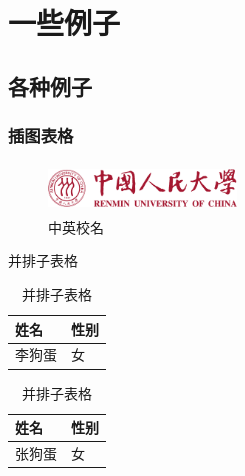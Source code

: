\chapter{一些例子}
\section{各种例子}
\subsection{插图表格}
\begin{figure}[htbp]
\centering\includegraphics[width=5cm,height=1.32cm]{figures/logo3.pdf}
\caption[中英校名]{中英校名}
\end{figure}
\begin{table}[htbp]
\noindent\begin{minipage}{0.5\textwidth}
\centering
\caption{并排子表格}
\label{tab:parallel1}
\begin{tabular}{p{2cm}p{2cm}}
\toprule[1.5pt]
姓名 & 性别 \\\midrule[1pt]
李狗蛋 & 女 \\\bottomrule[1.5pt]
\end{tabular}
\end{minipage}
\begin{minipage}{0.5\textwidth}
\centering
\caption{并排子表格}
\label{tab:parallel2}
\begin{tabular}{p{2cm}p{2cm}}
\toprule[1.5pt]
姓名 & 性别 \\\midrule[1pt]
张狗蛋 & 女 \\\bottomrule[1.5pt]
\end{tabular}
\end{minipage}
\end{table}
\begin{table}[htbp]
\centering
\caption{并排子表格}
\label{tab:subtable}
\hskip2cm
\end{table}

